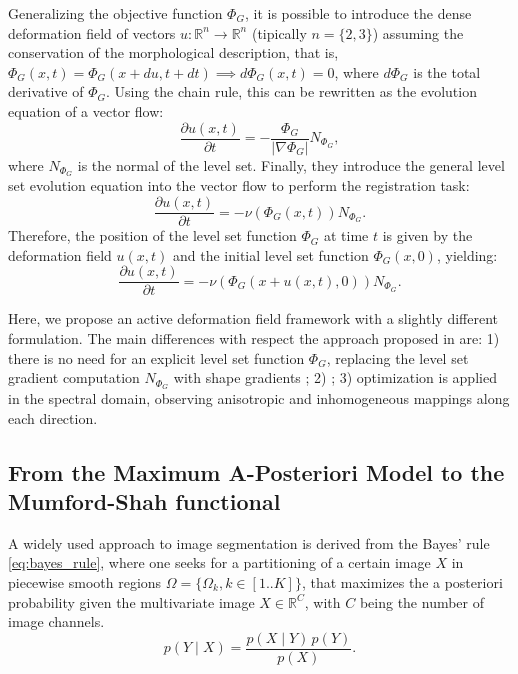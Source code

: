 Generalizing the objective function $\Phi_G$, it is possible to introduce the 
dense deformation field of vectors $u: \mathbb{R}^n \to \mathbb{R}^n$ (tipically
$n = \{ 2, 3 \}$) assuming the conservation of the morphological description, that is,
$\Phi_G(x,t) = \Phi_G( x + du, t + dt ) \implies d\Phi_G(x,t) = 0$, where $d\Phi_G$ is
the total derivative of $\Phi_G$. Using the chain rule, this can be rewritten as the 
evolution equation of a vector flow:
\begin{equation}
\frac{\partial u(x,t)}{\partial t}= - \frac{\Phi_G}{\left| \nabla \Phi_G \right|} N_{\Phi_G},
\end{equation}
where $N_{\Phi_G}$ is the normal of the level set. Finally, they introduce the general
level set evolution equation into the vector flow to perform the registration task:
\begin{equation}
\frac{\partial u(x,t)}{\partial t} = - \nu( \Phi_G(x,t) ) N_{\Phi_G}.
\end{equation}
Therefore, the position of the level set function $\Phi_G$ at time $t$ is given by the
deformation field $u(x,t)$ and the initial level set function $\Phi_G(x,0)$, yielding:
\begin{equation}
\frac{\partial u(x,t)}{\partial t} = - \nu( \Phi_G(x + u(x,t), 0) ) N_{\Phi_G}.
\end{equation}

Here, we propose an active deformation field framework with a slightly different
formulation. The main differences with respect the approach proposed in
\citep{gorthi_active_2011} are: 1) there is no need for an explicit level set function
$\Phi_G$, replacing the level set gradient computation $N_{\Phi_G}$ with shape
gradients \citep{jehan-besson_dream2s:_2003,herbulot_segmentation_2006}; 2) 
; 3) optimization is applied in the spectral
domain, observing anisotropic and inhomogeneous mappings along each direction.


\subsection{From the Maximum A-Posteriori Model to the Mumford-Shah functional}
\label{sec:methods_map}
%
A widely used approach to image segmentation is derived from the
Bayes' rule \eqref{eq:bayes_rule}, where one seeks for a partitioning
of a certain image $X$ in piecewise smooth regions $\Omega = \lbrace \Omega_k , 
k\in\left[ 1 .. K \right] \rbrace$,  that maximizes the a posteriori 
probability given the multivariate image $X \in \mathbb{R}^C$, 
with $C$ being the number of image channels.
\begin{equation}
p(Y \mid X) = \frac{p(X \mid Y)\, p(Y)}{p(X)}.
\label{eq:bayes_rule}
\end{equation}


